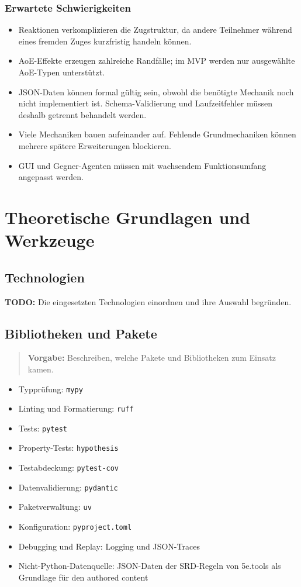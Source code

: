 \documentclass[
  12pt,
  a4paper,
  oneside,
  parskip=half,
  headings=normal
]{scrreprt}
\newcommand{\vorgabe}[1]{%
  \begin{quote}
    \small\color{hinweisfarbe}\textbf{Vorgabe:} #1
  \end{quote}
}
\newcommand{\todo}[1]{%
  \par\noindent\textcolor{red!70!black}{\textbf{TODO:} #1}\par
}
\begin{document}
\subsection{Erwartete Schwierigkeiten}
\begin{itemize}
  \item Reaktionen verkomplizieren die Zugstruktur, da andere Teilnehmer
        während eines fremden Zuges kurzfristig handeln können.
  \item AoE-Effekte erzeugen zahlreiche Randfälle; im MVP werden nur
        ausgewählte AoE-Typen unterstützt.
  \item JSON-Daten können formal gültig sein, obwohl die benötigte Mechanik
        noch nicht implementiert ist. Schema-Validierung und Laufzeitfehler
        müssen deshalb getrennt behandelt werden.
  \item Viele Mechaniken bauen aufeinander auf. Fehlende Grundmechaniken können
        mehrere spätere Erweiterungen blockieren.
  \item GUI und Gegner-Agenten müssen mit wachsendem Funktionsumfang angepasst
        werden.
\end{itemize}

\chapter{Theoretische Grundlagen und Werkzeuge}

\section{Technologien}
\todo{Die eingesetzten Technologien einordnen und ihre Auswahl begründen.}

\section{Bibliotheken und Pakete}

\vorgabe{Beschreiben, welche Pakete und Bibliotheken zum Einsatz kamen.}

\begin{itemize}
  \item Typprüfung: \texttt{mypy}
  \item Linting und Formatierung: \texttt{ruff}
  \item Tests: \texttt{pytest}
  \item Property-Tests: \texttt{hypothesis}
  \item Testabdeckung: \texttt{pytest-cov}
  \item Datenvalidierung: \texttt{pydantic}
  \item Paketverwaltung: \texttt{uv}
  \item Konfiguration: \texttt{pyproject.toml}
  \item Debugging und Replay: Logging und JSON-Traces
  \item Nicht-Python-Datenquelle: JSON-Daten der SRD-Regeln von 5e.tools als
        Grundlage für den authored content
\end{itemize}
\end{document}
